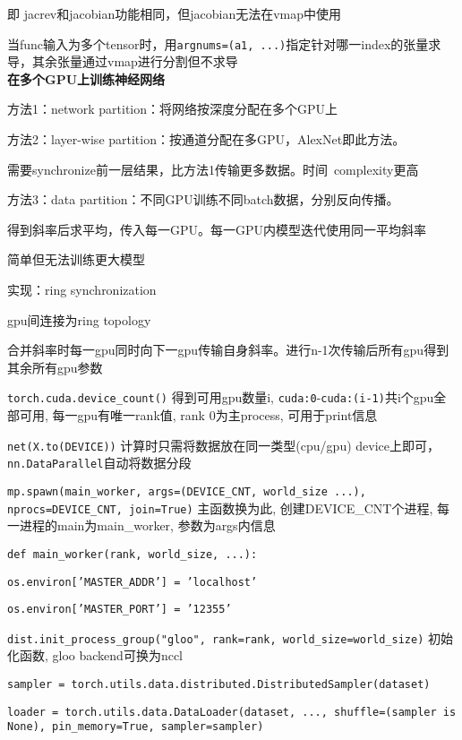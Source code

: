 \documentclass[UTF8]{ctexart}
\begin{document}
  \quad 即 jacrev和jacobian功能相同，但jacobian无法在vmap中使用
  
  当func输入为多个tensor时，用\texttt{argnums=(a1, ...)}指定针对哪一index的张量求导，其余张量通过vmap进行分割但不求导\\
\textbf{在多个GPU上训练神经网络}

  方法1：network partition：将网络按深度分配在多个GPU上

  方法2：layer-wise partition：按通道分配在多GPU，AlexNet即此方法。
  
  \quad 需要synchronize前一层结果，比方法1传输更多数据。时间\ complexity更高

  方法3：data partition：不同GPU训练不同batch数据，分别反向传播。

  \quad 得到斜率后求平均，传入每一GPU。每一GPU内模型迭代使用同一平均斜率
  
  \quad 简单但无法训练更大模型

  \quad 实现：ring synchronization 

  \quad \quad gpu间连接为ring topology
  
  \quad \quad 合并斜率时每一gpu同时向下一gpu传输自身斜率。进行n-1次传输后所有gpu得到其余所有gpu参数
  
  \quad \texttt{torch.cuda.device\_count()} 得到可用gpu数量i, \texttt{cuda:0}-\texttt{cuda:(i-1)}共i个gpu全部可用, 每一gpu有唯一rank值, rank 0为主process, 可用于print信息

  \quad \texttt{net(X.to(DEVICE))} 计算时只需将数据放在同一类型(cpu/gpu) device上即可，\texttt{nn.DataParallel}自动将数据分段

  \quad \texttt{mp.spawn(main\_worker, args=(DEVICE\_CNT, world\_size ...), nprocs=DEVICE\_CNT, join=True)} 主函数换为此, 创建DEVICE\_CNT个进程, 每一进程的main为main\_worker, 参数为args内信息

  \quad \texttt{def main\_worker(rank, world\_size, ...):}

  \quad \quad \texttt{os.environ['MASTER\_ADDR'] = 'localhost'}
  
  \quad \quad \texttt{os.environ['MASTER\_PORT'] = '12355'} 

  \quad \quad \texttt{dist.init\_process\_group("gloo", rank=rank, world\_size=world\_size)} 初始化函数, gloo backend可换为nccl

  \quad \quad \texttt{sampler = torch.utils.data.distributed.DistributedSampler(dataset)}

  \quad \quad \texttt{loader = torch.utils.data.DataLoader(dataset, ..., shuffle=(sampler is None), pin\_memory=True, sampler=sampler)}
\end{document}
